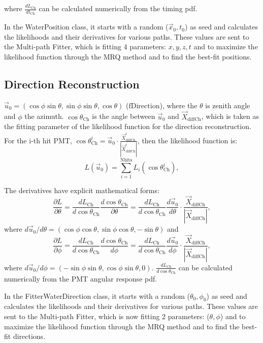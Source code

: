 where $\frac{dL_{\mathrm{Ch}}}{dt_{\mathrm{Ch}}}$ can be calculated numerically from the timing pdf. 

In the WaterPosition class, it starts with a random ($\vec{x}_0,t_0$) as seed and calculates the likelihoods and their derivatives for various paths. These values are sent to the Multi-path Fitter, which is fitting 4 parameters: $x,y,z,t$ and to maximize the likelihood function through the MRQ method and to find the best-fit positions.

\subsection{Direction Reconstruction}
 $\vec{u}_{0}=(\cos\phi\sin\theta,\sin\phi\sin\theta,\cos\theta)$ ($\mathrm{fDirection}$), where the $\theta$ is zenith angle and $\phi$ the azimuth. $\cos\theta_{\mathrm{Ch}}$ is the angle between $\vec{u}_{0}$ and $\vec{X}_{{\mathrm{diffCh}}}$, which is taken as the fitting parameter of the likelihood function for the direction reconstruction. For the i-th hit PMT, $\cos\theta^i_{\mathrm{Ch}}=\vec{u}_0\cdot\frac{\vec{X}^i_{{\mathrm{diffCh}}}}{|\vec{X}^i_{{\mathrm{diffCh}}}|}$, then the likelihood function is:
\[
L(\vec{u}_0)=\sum_{i=1}^{{\mathrm{Nhits}}}L_i(\cos\theta_{\mathrm{Ch}}^i),
\]

The derivatives have explicit mathematical forms:
\[
\frac{\partial L}{\partial\theta}=\frac{dL_{\mathrm{Ch}}}{d\cos\theta_{\mathrm{Ch}}}\frac{d\cos\theta_{\mathrm{Ch}}}{\partial\theta}
=\frac{dL_{\mathrm{Ch}}}{d\cos\theta_{\mathrm{Ch}}}\frac{d\vec{u}_0}{d\theta}\cdot\frac{\vec{X}_{{\mathrm{diffCh}}}}{|\vec{X}_{{\mathrm{diffCh}}}|},
\]
where $d\vec{u}_0/d\theta=(\cos\phi\cos\theta, \sin\phi\cos\theta, -\sin\theta)$ and 
\[
\frac{\partial　L}{\partial\phi}=\frac{dL_{\mathrm{Ch}}}{d\cos\theta_{\mathrm{Ch}}}\frac{d\cos\theta_{\mathrm{Ch}}}{d\phi}
=\frac{dL_{\mathrm{Ch}}}{d\cos\theta_{\mathrm{Ch}}}\frac{d\vec{u}_0}{d\phi}\cdot\frac{\vec{X}_{{\mathrm{diffCh}}}}{|\vec{X}_{{\mathrm{diffCh}}}|},
\] where $d\vec{u}_0/d\phi=(-\sin\phi\sin\theta, \cos\phi\sin\theta, 0)$. $\frac{dL_{\mathrm{Ch}}}{d\cos\theta_{\mathrm{Ch}}}$ can be calculated numerically from the PMT angular response pdf.

In the FitterWaterDirection class, it starts with a random ($\theta_0,\phi_0$) as seed and calculates the likelihoods and their derivatives for various paths. These values are sent to the Multi-path Fitter, which is now fitting 2 parameters: ($\theta,\phi$) and to maximize the likelihood function through the MRQ method and to find the best-fit directions.

